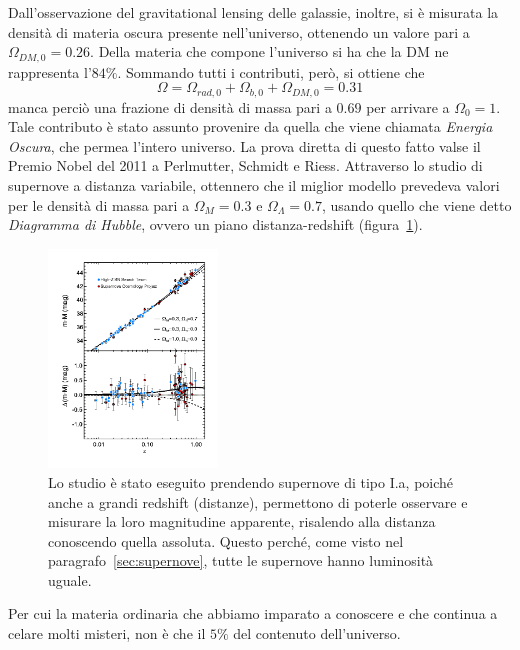 Dall'osservazione del gravitational lensing delle galassie, inoltre, si è misurata la densità di materia oscura presente nell'universo, ottenendo un valore pari a $\Omega_{DM,0} = 0.26$. Della materia che compone l'universo si ha che la DM ne rappresenta l'$84\%$. Sommando tutti i contributi, però, si ottiene che
\[
    \Omega = \Omega_{rad,0} + \Omega_{b,0} + \Omega_{DM,0} = 0.31
\]
manca perciò una frazione di densità di massa pari a $0.69$ per arrivare a $\Omega_0 = 1$. Tale contributo è stato assunto provenire da quella che viene chiamata \textit{Energia Oscura}, che permea l'intero universo. La prova diretta di questo fatto valse il Premio Nobel del 2011 a Perlmutter, Schmidt e Riess. Attraverso lo studio di supernove a distanza variabile, ottennero che il miglior modello prevedeva valori per le densità di massa pari a $\Omega_M = 0.3$ e $\Omega_\Lambda = 0.7$, usando quello che viene detto \textit{Diagramma di Hubble}, ovvero un piano distanza-redshift (figura~\ref{fig:diagramma-hubble}).
\begin{figure}
    \centering
    \includegraphics[width=0.4\textwidth]{immagini/hubble_diagram.png}
    \caption{Lo studio è stato eseguito prendendo supernove di tipo I.a, poiché anche a grandi redshift (distanze), permettono di poterle osservare e misurare la loro magnitudine apparente, risalendo alla distanza conoscendo quella assoluta. Questo perché, come visto nel paragrafo~\ref{sec:supernove}, tutte le supernove hanno luminosità uguale.}\label{fig:diagramma-hubble}
\end{figure}

Per cui la materia ordinaria che abbiamo imparato a conoscere e che continua a celare molti misteri, non è che il $5\%$ del contenuto dell'universo. 